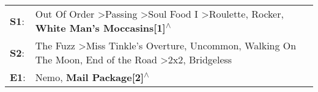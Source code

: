 \begin{supertabular}{p{0.03\textwidth}p{0.92\textwidth}}
 \textbf{S1}:  &                   Out Of Order\textsuperscript{} \textgreater \enspace Passing\textsuperscript{} \textgreater \enspace Soul Food I\textsuperscript{} \textgreater \enspace Roulette\textsuperscript{}, \enspace Rocker\textsuperscript{}, \enspace \textbf{White Man's Moccasins[1]\textsuperscript{$\wedge$}}  \enspace  \\
 \textbf{S2}:  &  The Fuzz\textsuperscript{} \textgreater \enspace Miss Tinkle's Overture\textsuperscript{}, \enspace Uncommon\textsuperscript{}, \enspace Walking On The Moon\textsuperscript{}, \enspace End of the Road\textsuperscript{} \textgreater \enspace 2x2\textsuperscript{}, \enspace Bridgeless\textsuperscript{}  \enspace  \\
 \textbf{E1}:  &                                                                                                                                                                                                                            Nemo\textsuperscript{}, \enspace \textbf{Mail Package[2]\textsuperscript{$\wedge$}}  \enspace  \\
\end{supertabular}
